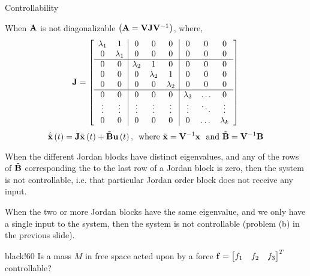 \documentclass[aspectratio=169]{beamer}
\def\mf{\ensuremath\mathbf}
\def\lp{\ensuremath\left(}
\def\rp{\ensuremath\right)}
\def\bmx{\ensuremath\begin{bmatrix*}[r]}
\def\emx{\ensuremath\end{bmatrix*}}
\newcommand{\demoex}[2]{\onslide<#1->\begin{color}{black!60} #2 \end{color}}
\newcommand{\ct}[1]{\lp #1\rp}
\begin{document}
\begin{frame}{Controllability}
\begin{small}
When $\mf{A}$ is not diagonalizable $\ct{\mf{A} = \mf{V}\mf{J}\mf{V}^{-1}}$, where,\vspace{-0.2cm}
{\scriptsize \[ \mf{J} = \left[
\begin{array}{cc|ccc|ccc}
\lambda_1 & 1 & 0 & 0 & 0 & 0 & 0 & 0 \\
0 & \lambda_1 & 0 & 0 & 0 & 0 & 0 & 0 \\
\hline
0 & 0 & \lambda_2 & 1 & 0 & 0 & 0 & 0 \\
0 & 0 & 0 & \lambda_2 & 1 & 0 & 0 & 0 \\
0 & 0 & 0 & 0 & \lambda_2 & 0 & 0 & 0 \\
\hline
0 & 0 & 0 & 0 & 0 & \lambda_3 & \ldots & 0 \\
\vdots & \vdots & \vdots & \vdots & \vdots & \vdots & \ddots & \vdots \\
0 & 0 & 0 & 0 & 0 & 0 & \dots & \lambda_k
\end{array}
\right]
\]}
\vspace{-0.25cm}
\[ \dot{\tilde{\mf{x}}}\ct{t} = \mf{J}\tilde{\mf{x}}\ct{t} + \tilde{\mf{B}}\mf{u}\ct{t}, \,\,\,\text{where } \tilde{\mf{x}} = \mf{V}^{-1}\mf{x} \,\, \text{ and } \tilde{\mf{B}} = \mf{V}^{-1}\mf{B} \]

When the different Jordan blocks have distinct eigenvalues, and any of the rows of $\tilde{\mf{B}}$ corresponding the to the last row of a Jordan block is zero, then the system is not controllable, i.e. that particular Jordan order block does not receive any input.\vspace{0.1cm}

When the two or more Jordan blocks have the same eigenvalue, and we only have a single input to the system, then the system is not controllable (problem (b) in the previous slide).\vspace{0.2cm}
\end{small}

\demoex{2}{Is a mass $M$ in free space acted upon by a force $\mf{f} = \bmx f_1 & f_2 & f_3\emx^T$ controllable?}
\end{frame}
\end{document}
